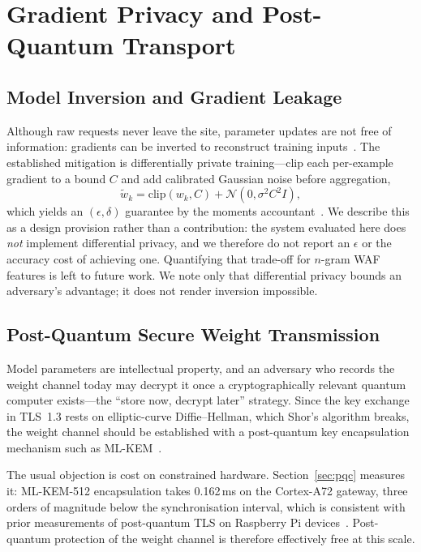\documentclass[conference]{IEEEtran}
\begin{document}
\section{Gradient Privacy and Post-Quantum Transport}
\label{sec:crypto}

\subsection{Model Inversion and Gradient Leakage}
Although raw requests never leave the site, parameter updates are not free of information: gradients can be inverted to reconstruct training inputs~\cite{zhu2019}. The established mitigation is differentially private training---clip each per-example gradient to a bound $C$ and add calibrated Gaussian noise before aggregation,
\begin{equation}
    \tilde{w}_k = \mathrm{clip}(w_k, C) + \mathcal{N}(0, \sigma^2 C^2 I),
\end{equation}
which yields an $(\epsilon,\delta)$ guarantee by the moments accountant~\cite{abadi2016}. We describe this as a design provision rather than a contribution: the system evaluated here does \emph{not} implement differential privacy, and we therefore do not report an $\epsilon$ or the accuracy cost of achieving one. Quantifying that trade-off for $n$-gram WAF features is left to future work. We note only that differential privacy bounds an adversary's advantage; it does not render inversion impossible.

\subsection{Post-Quantum Secure Weight Transmission}
Model parameters are intellectual property, and an adversary who records the weight channel today may decrypt it once a cryptographically relevant quantum computer exists---the ``store now, decrypt later'' strategy. Since the key exchange in TLS~1.3 rests on elliptic-curve Diffie--Hellman, which Shor's algorithm breaks, the weight channel should be established with a post-quantum key encapsulation mechanism such as ML-KEM~\cite{fips203}.

The usual objection is cost on constrained hardware. Section~\ref{sec:pqc} measures it: ML-KEM-512 encapsulation takes 0.162\,ms on the Cortex-A72 gateway, three orders of magnitude below the synchronisation interval, which is consistent with prior measurements of post-quantum TLS on Raspberry Pi devices~\cite{friend_pqtls}. Post-quantum protection of the weight channel is therefore effectively free at this scale.
\end{document}
